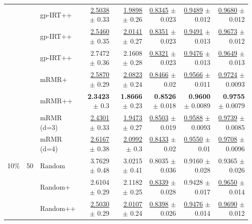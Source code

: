 \begin{longtable}{llp{}rrrrr}
 &  & gp-IRT++ & \underline{2.5038} {\scriptsize $\pm$ 0.33} & \underline{1.9898} {\scriptsize $\pm$ 0.26} & \underline{0.8345} {\scriptsize $\pm$ 0.023} & \underline{0.9489} {\scriptsize $\pm$ 0.012} & \underline{0.9680} {\scriptsize $\pm$ 0.012} \\
 &  & gp-IRT++ & \underline{2.5460} {\scriptsize $\pm$ 0.35} & \underline{2.0141} {\scriptsize $\pm$ 0.27} & \underline{0.8351} {\scriptsize $\pm$ 0.023} & \underline{0.9491} {\scriptsize $\pm$ 0.013} & \underline{0.9673} {\scriptsize $\pm$ 0.012} \\
 &  & gp-IRT++ & 2.7472 {\scriptsize $\pm$ 0.36} & 2.1608 {\scriptsize $\pm$ 0.28} & \underline{0.8321} {\scriptsize $\pm$ 0.023} & \underline{0.9476} {\scriptsize $\pm$ 0.013} & \underline{0.9649} {\scriptsize $\pm$ 0.013} \\
 &  & mRMR+ & \underline{2.5870} {\scriptsize $\pm$ 0.29} & \underline{2.0823} {\scriptsize $\pm$ 0.24} & \underline{0.8466} {\scriptsize $\pm$ 0.02} & \underline{0.9566} {\scriptsize $\pm$ 0.011} & \underline{0.9724} {\scriptsize $\pm$ 0.0093} \\
 &  & mRMR++ & \textbf{2.3423} {\scriptsize $\pm$ 0.3} & \textbf{1.8666} {\scriptsize $\pm$ 0.23} & \textbf{0.8526} {\scriptsize $\pm$ 0.018} & \textbf{0.9600} {\scriptsize $\pm$ 0.0089} & \textbf{0.9755} {\scriptsize $\pm$ 0.0079} \\
 &  & mRMR (d=3) & \underline{2.4301} {\scriptsize $\pm$ 0.33} & \underline{1.9473} {\scriptsize $\pm$ 0.27} & \underline{0.8503} {\scriptsize $\pm$ 0.019} & \underline{0.9588} {\scriptsize $\pm$ 0.0093} & \underline{0.9739} {\scriptsize $\pm$ 0.0085} \\
 &  & mRMR (d=4) & \underline{2.6167} {\scriptsize $\pm$ 0.38} & \underline{2.0992} {\scriptsize $\pm$ 0.3} & \underline{0.8433} {\scriptsize $\pm$ 0.02} & \underline{0.9550} {\scriptsize $\pm$ 0.01} & \underline{0.9708} {\scriptsize $\pm$ 0.0096} \\
\midrule
10\% & 50 & Random & 3.7629 {\scriptsize $\pm$ 0.48} & 3.0215 {\scriptsize $\pm$ 0.41} & 0.8035 {\scriptsize $\pm$ 0.036} & 0.9160 {\scriptsize $\pm$ 0.028} & 0.9365 {\scriptsize $\pm$ 0.026} \\
 &  & Random+ & 2.6104 {\scriptsize $\pm$ 0.29} & 2.1182 {\scriptsize $\pm$ 0.25} & \underline{0.8339} {\scriptsize $\pm$ 0.028} & 0.9428 {\scriptsize $\pm$ 0.017} & \underline{0.9650} {\scriptsize $\pm$ 0.014} \\
 &  & Random++ & \underline{2.5030} {\scriptsize $\pm$ 0.29} & \underline{2.0107} {\scriptsize $\pm$ 0.24} & \underline{0.8398} {\scriptsize $\pm$ 0.026} & \underline{0.9476} {\scriptsize $\pm$ 0.014} & \underline{0.9690} {\scriptsize $\pm$ 0.012} \\

\end{longtable}
